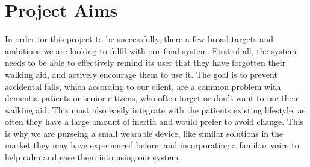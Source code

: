 \section{Project Aims}
In order for this project to be successfully, there a few broad targets and ambitions we are looking to fulfil with our final system.
First of all, the system needs to be able to effectively remind its user that they have forgotten their walking aid, and actively encourage them to use it. The goal is to prevent accidental falls, which according to our client, are a common problem with dementia patients or senior citizens, who often forget or don't want to use their walking aid. This must also easily integrate with the patients existing lifestyle, as often they have a large amount of inertia and would prefer to avoid change. This is why we are purseing a small wearable device, like similar solutions in the market they may have experienced before, and incorporating a familiar voice to help calm and ease them into using our system.
